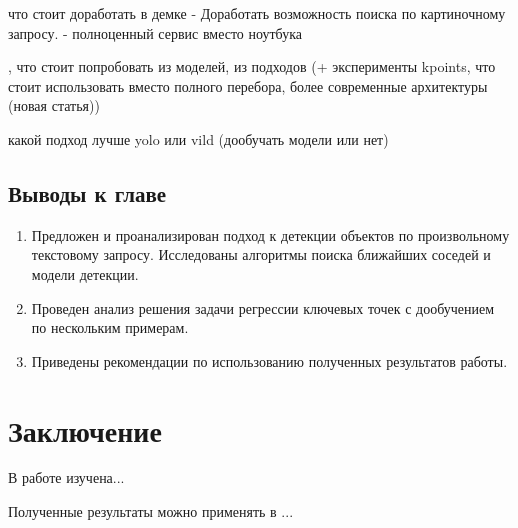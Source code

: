 \documentclass[a4paper,14pt]{article}
\begin{document}
    что стоит доработать в демке
    - Доработать возможность поиска по картиночному запросу.
    - полноценный сервис вместо ноутбука
    
    , что стоит попробовать из моделей, из подходов (+ эксперименты kpoints, что стоит использовать вместо полного перебора, более современные архитектуры (новая статья))
    
    какой подход лучше yolo или vild (дообучать модели или нет)

    \subsection{Выводы к главе \thesection}
    \begin{enumerate}
        \itemsep0em
        \item Предложен и проанализирован подход к детекции объектов по произвольному текстовому запросу. Исследованы алгоритмы поиска ближайших соседей и модели детекции.
        \item Проведен анализ решения задачи регрессии ключевых точек с дообучением по нескольким примерам.
        \item Приведены рекомендации по использованию полученных результатов работы.
    \end{enumerate}

    \newpage


    \section{Заключение}

    В работе изучена...

    Полученные результаты можно применять в ...

    \newpage
    \renewcommand{\refname}{{\normalsize \hfill Список использованных источников \hfill}}
%    
    
    
    \newpage
\end{document}

